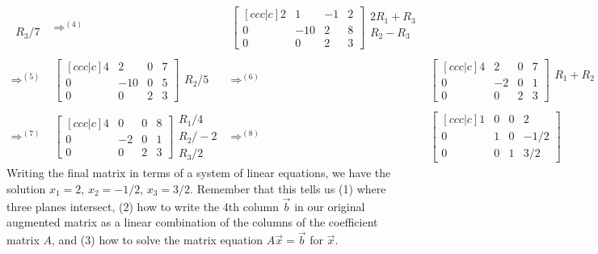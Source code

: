 \begin{example}
$$\begin{array}{rlcl}
 \begin{array}{lr}\ \\ \ \\R_3/7 \end{array}
&\Rightarrow^{(4)}& 
\begin{bmatrix}[ccc|c] 2&1&-1&2\\0&-10&2&8\\0&0&2&3\end{bmatrix} 
\begin{array}{l} 2R_1+R_3\\R_2-R_3\\ \ \end{array}
\\ \\ \Rightarrow^{(5)}&
 \begin{bmatrix}[ccc|c] 4&2&0&7\\0&-10&0&5\\0&0&2&3\end{bmatrix}  
 \begin{array}{lr}\ \\R_2/5\\ \ \end{array} 
&\Rightarrow^{(6)}& 
\begin{bmatrix}[ccc|c] 4&2&0&7\\0&-2&0&1\\0&0&2&3\end{bmatrix}  
\begin{array}{lr} R_1+R_2\\ \ \\ \ \end{array}
\\ \\ \Rightarrow^{(7)}&
\begin{bmatrix}[ccc|c] 4&0&0&8\\0&-2&0&1\\0&0&2&3\end{bmatrix} 
\begin{array}{lr} R_1/4\\R_2/-2\\R_3/2 \end{array}
&\Rightarrow^{(8)}&  
\begin{bmatrix}[ccc|c] 1&0&0&2\\0&1&0&-1/2\\0&0&1&3/2\end{bmatrix} 
\end{array}
$$
Writing the final matrix in terms of a system of linear equations, we have the solution {$x_1=2$, $x_2=-1/2$, $x_3=3/2$}. Remember that this tells us (1) where three planes intersect, (2) how to write the 4th column $\vec b$ in our original augmented matrix as a linear combination of the columns of the coefficient matrix $A$, and (3) how to solve the matrix equation $A\vec x = \vec b$ for $\vec x$.
\end{example}


